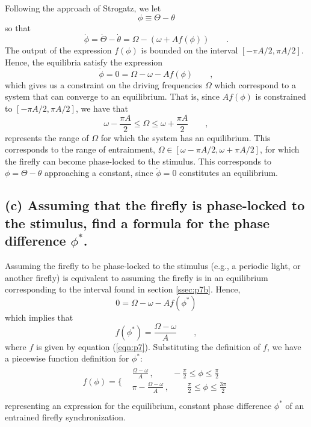 \documentclass[draft]{agujournal2019}
\begin{document}
Following the approach of Strogatz, we let
\begin{equation*}
    \phi \equiv \Theta -  \theta 
\end{equation*}
so that 
\begin{equation*}
    \dot \phi = \dot \Theta -  \dot \theta = \Omega -  (\omega + Af(\phi)) \qquad .
\end{equation*}
The output of the expression $f(\phi)$ is bounded on the interval $[-\pi A/2,\pi A/2]$. Hence, the equilibria satisfy the expression 
\begin{equation*}
    \dot \phi = 0 = \Omega - \omega -  A f(\phi) \qquad ,
\end{equation*}
which gives us a constraint on the driving frequencies $\Omega$ which correspond to a system that can converge to an equilibrium. That is, since $Af(\phi)$ is constrained to $[-\pi A/2,\pi A/2]$, we have that 
\begin{equation*}
    \omega - \frac{\pi A}{2} \leq \Omega \leq \omega + \frac{\pi A}{2} \qquad ,
\end{equation*}
represents the range of $\Omega$ for which the system has an equilibrium. This corresponds to the range of entrainment, $\Omega \in [\omega-\pi A/2,\omega + \pi A/2]$, for which the firefly can become phase-locked to the stimulus. This corresponds to $\phi=\Theta - \theta$ approaching a constant, since $\dot \phi =0$ constitutes an equilibrium. 


\subsection{(c) Assuming that the firefly is phase-locked to the stimulus, find a formula for the phase difference $\phi^* $. }
\label{ssec:p7c}

Assuming the firefly to be phase-locked to the stimulus (e.g., a periodic light, or another firefly) is equivalent to assuming the firefly is in an equilibrium corresponding to the interval found in section \ref{ssec:p7b}. Hence,
\begin{equation*}
    0 = \Omega - \omega -  A f(\phi^*)
\end{equation*}
which implies that 
\begin{equation*}
    f(\phi^*) = \frac{\Omega-\omega}{A} \qquad ,
\end{equation*}
where $f$ is given by equation (\ref{eqn:p7}). Substituting the definition of $f$, we have a piecewise function definition for $\phi^*$:
\begin{equation}
\label{eqn:p7_phistar}
\begin{array}{cc}
  f(\phi)= \Bigg\{ & 
    \begin{array}{cc}
      \frac{\Omega-\omega}{A}\,,\, \qquad -\frac{\pi}{2} \leq \phi \leq \frac{\pi}{2}\\
      \pi - \frac{\Omega-\omega}{A} \,,\, \qquad \frac{\pi}{2} \leq \phi \leq \frac{3\pi}{2} \\
    \end{array}
\end{array}
\end{equation}
representing an expression for the equilibrium, constant phase difference $\phi^*$ of an entrained firefly synchronization. 
\end{document}
